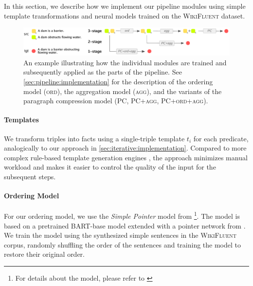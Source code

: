 In this section, we describe how we implement our pipeline modules using simple template transformations and neural models trained on the \textsc{WikiFluent} dataset.

\begin{figure}[t]
    \centering
    \includegraphics[width=\textwidth]{img/pipeline-variants.pdf}

    \caption{An example illustrating how the individual modules are trained and subsequently applied as the parts of the pipeline. See \autoref{sec:pipeline:implementation} for the description of the ordering model (\textsc{ord}), the aggregation model (\textsc{agg}), and the variants of the paragraph compression model (\textsc{PC, PC+agg, PC+ord+agg}).}
    \label{fig:pipeline:variants}
\end{figure}

\paragraph{Templates}
We transform triples into facts using a single-triple template $t_i$ for each predicate, analogically to our approach in \autoref{sec:iterative:implementation}. Compared to more complex rule-based template generation engines \cite{laha2020scalable,heidari2021getting,mehta2021improving}, the approach minimizes manual workload and makes it easier to control the quality of the input for the subsequent steps.

\paragraph{Ordering Model}
For our ordering model, we use the \emph{Simple Pointer} model from \citet{calizzano2021ordering}\footnote{For details about the model, please refer to \citet{calizzano2021ordering}}. The model is based on a pretrained BART-base model \cite{lewisBARTDenoisingSequencetoSequence2019} extended with a pointer network from \citet{wang2019hierarchical}. We train the model using the synthesized simple sentences in the \textsc{WikiFluent} corpus, randomly shuffling the order of the sentences and training the model to restore their original order.


